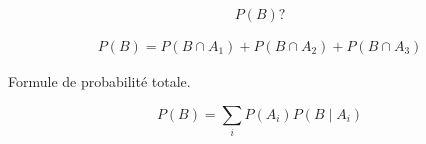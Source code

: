 \documentclass{beamer}
\begin{document}
\begin{frame}[t]
\begin{columns}
\begin{column}{0.6\textwidth}
           {
               $$
               P(B)?
               $$
           }

           {
               \scriptsize
               \begin{eqnarray*}
                   P(B) = P(B \cap A_1) + P(B \cap A_2) + P(B \cap A_3)
               \end{eqnarray*}
           }
           {
               \begin{block}{Formule de probabilité totale.}
                   
                   \small
                   $$
                   P(B) = \sum_{i} P(A_i) P(B\;|\;A_i)
                   $$
               \end{block}
           }
       \end{column}

   \end{columns} 
\end{frame}
\end{document}
